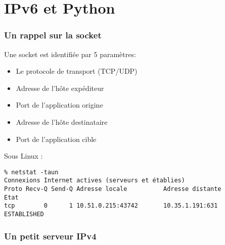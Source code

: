 \section{IPv6 et Python}


\begin{frame}[fragile]{}
	\frametitle{Un rappel sur la socket}
	Une socket est identifiée par 5 paramètres:
	\begin{itemize}
		\item Le protocole de transport (TCP/UDP)
		\item Adresse de l'hôte expéditeur
		\item Port de l'application origine
		\item Adresse de l'hôte destinataire
		\item Port de l'application cible
	\end{itemize}
	
	Sous Linux :
	\begin{verbatim}
% netstat -taun
Connexions Internet actives (serveurs et établies)
Proto Recv-Q Send-Q Adresse locale          Adresse distante        Etat      
tcp        0      1 10.51.0.215:43742       10.35.1.191:631         ESTABLISHED  
	\end{verbatim}
\end{frame}

\begin{frame}[fragile]{}
	\frametitle{Un petit serveur IPv4}
    \begin{minipage}{0.5\textwidth}
      \inputminted[mathescape,
        linenos,
        fontsize=\scriptsize,
        framesep=2mm]{python}{../echo_server_v4.py}
    \end{minipage}
	
\end{frame}



